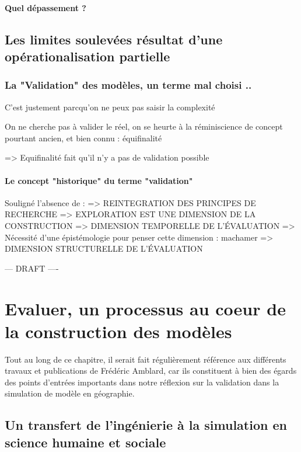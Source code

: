 {\paragraph{Quel dépassement ?}

\subsection{Les limites soulevées résultat d'une opérationalisation partielle}

\subsubsection{La "Validation" des modèles, un terme mal choisi ..}

C'est justement parcqu'on ne peux pas saisir la complexité 

On ne cherche pas à valider le réel, on se heurte à la réminiscience de concept pourtant ancien, 
et bien connu : équifinalité

=> Equifinalité fait qu'il n'y a pas de validation possible

\paragraph{Le concept "historique" du terme "validation"}

Souligné l'absence de : 
=> REINTEGRATION DES PRINCIPES DE RECHERCHE
=> EXPLORATION EST UNE DIMENSION DE LA CONSTRUCTION
=> DIMENSION TEMPORELLE DE L'ÉVALUATION => Nécessité d'une épistémologie pour penser cette dimension : machamer
=> DIMENSION STRUCTURELLE DE L'ÉVALUATION


--- DRAFT  ----
\section {Evaluer, un processus au coeur de la construction des modèles } 

Tout au long de ce chapitre, il serait fait régulièrement référence aux différents travaux et publications de Frédéric Amblard, car ils constituent à bien des égards des points d'entrées importants dans notre réflexion sur la validation dans la simulation de modèle en géographie.

\subsection{Un transfert de l'ingénierie à la simulation en science humaine et sociale}

}
